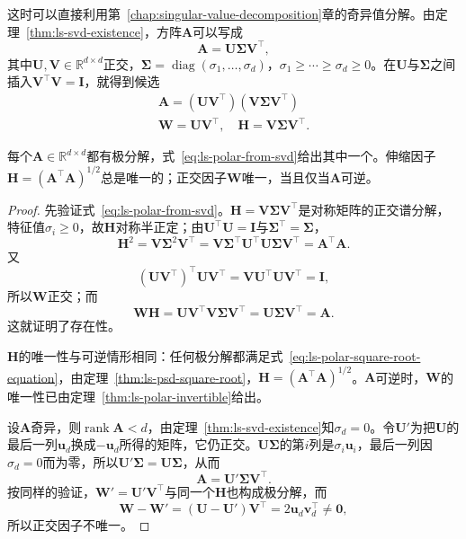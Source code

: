 这时可以直接利用第~\ref{chap:singular-value-decomposition}章的奇异值分解。由定理~\ref{thm:ls-svd-existence}，方阵$\bm A$可以写成
\[
 \bm A=\bm U\bm\Sigma\bm V^\top ,
\]
其中$\bm U,\bm V\in\mathbb R^{d\times d}$正交，$\bm\Sigma=\operatorname{diag}(\sigma_1,\ldots,\sigma_d)$，$\sigma_1\geq\cdots\geq\sigma_d\geq0$。在$\bm U$与$\bm\Sigma$之间插入$\bm V^\top\bm V=\bm I$，就得到候选
\begin{equation}
\begin{gathered}
 \bm A=(\bm U\bm V^\top)(\bm V\bm\Sigma\bm V^\top)\\
 \bm W=\bm U\bm V^\top,\quad \bm H=\bm V\bm\Sigma\bm V^\top .
\end{gathered}
\label{eq:ls-polar-from-svd}
\end{equation}

\begin{theorem}[一般方阵的极分解]
\label{thm:ls-polar-general}
每个$\bm A\in\mathbb R^{d\times d}$都有极分解，式~\eqref{eq:ls-polar-from-svd}给出其中一个。伸缩因子$\bm H=(\bm A^\top\bm A)^{1/2}$总是唯一的；正交因子$\bm W$唯一，当且仅当$\bm A$可逆。
\end{theorem}
\begin{proof}
先验证式~\eqref{eq:ls-polar-from-svd}。$\bm H=\bm V\bm\Sigma\bm V^\top$是对称矩阵的正交谱分解，特征值$\sigma_i\geq0$，故$\bm H$对称半正定；由$\bm U^\top\bm U=\bm I$与$\bm\Sigma^\top=\bm\Sigma$，
\[
 \bm H^2=\bm V\bm\Sigma^2\bm V^\top
 =\bm V\bm\Sigma^\top\bm U^\top\bm U\bm\Sigma\bm V^\top
 =\bm A^\top\bm A .
\]
又
\[
 (\bm U\bm V^\top)^\top\bm U\bm V^\top=\bm V\bm U^\top\bm U\bm V^\top=\bm I ,
\]
所以$\bm W$正交；而
\[
 \bm W\bm H=\bm U\bm V^\top\bm V\bm\Sigma\bm V^\top=\bm U\bm\Sigma\bm V^\top=\bm A .
\]
这就证明了存在性。

$\bm H$的唯一性与可逆情形相同：任何极分解都满足式~\eqref{eq:ls-polar-square-root-equation}，由定理~\ref{thm:ls-psd-square-root}，$\bm H=(\bm A^\top\bm A)^{1/2}$。$\bm A$可逆时，$\bm W$的唯一性已由定理~\ref{thm:ls-polar-invertible}给出。

设$\bm A$奇异，则$\operatorname{rank}\bm A<d$，由定理~\ref{thm:ls-svd-existence}知$\sigma_d=0$。令$\bm U'$为把$\bm U$的最后一列$\bm u_d$换成$-\bm u_d$所得的矩阵，它仍正交。$\bm U\bm\Sigma$的第$i$列是$\sigma_i\bm u_i$，最后一列因$\sigma_d=0$而为零，所以$\bm U'\bm\Sigma=\bm U\bm\Sigma$，从而
\[
 \bm A=\bm U'\bm\Sigma\bm V^\top .
\]
按同样的验证，$\bm W'=\bm U'\bm V^\top$与同一个$\bm H$也构成极分解，而
\[
 \bm W-\bm W'=(\bm U-\bm U')\bm V^\top=2\bm u_d\bm v_d^\top\neq\bm0 ,
\]
所以正交因子不唯一。
\end{proof}

